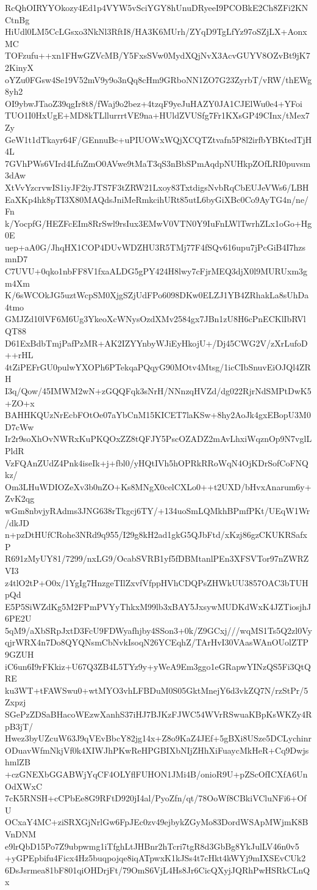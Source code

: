 RcQhOIRYYOkozy4Ed1p4VYW5vSciYGY8hUnuDRyeeI9PCOBkE2Ch8ZFi2KNCtnBg
HiUdl0LM5CcLGsxo3NkNl3RftI8/HA3K6MUrh/ZYqD9TgLfYz97oSZjLX+AonxMC
TOFzufu++xn1FHwGZVcMB/Y5FxsSVw0MydXQjNvX3AcvGUYV8OZvBt9jK72KinyX
oYZu0FGsw4Se19V52mV9y9o3nQq8cHm9GRboNN1ZO7G23ZyrbT/vRW/thEWg8yh2
OI9ybwJTaoZ39qgIr8t8/fWaj9o2bez+4tzqF9yeJuHAZY0JA1CJElWu0e4+YFoi
TUO1I0HxUgE+MD8kTLllurrrtVE9na+HUldZVUSfg7Fr1KXsGP49CInx/tMex7Zy
GeW1t1dTkayr64F/GEnnuBc+uPIUOWxWQjXCQTZtvafn5P8l2irfbYBKtedTjH4L
7GVhPWs6VIrd4LfuZmO0AVwe9tMaT3qS3nBbSPmAqdpNUHkpZOfLRI0puvsm3dAw
XtVvYzcrvwIS1iyJF2iyJTS7F3tZRW21Lxoy83TxtdigsNvbRqCbEUJeVWs6/LBH
EaXKp4hk8pTI3X80MAQdsJniMeRmkcihURt85utL6byGiXBc0Co9AyTG4n/ne/Fn
k/YocpfG/HEZFcEIm8RrSwl9rsIux3EMwV0VTN0Y9IuFnLWlTwrhZLx1oGo+Hg0E
uep+aA0G/JhqHX1COP4DUvWDZHU3R5TMj77F4fSQv616upu7jPcGiB4I7hzsmnD7
C7UVU+0qko1nbFF8V1fxaALDG5gPY424H8lwy7cFjrMEQ3djX0l9MURUxm3gm4Xm
K/6sWCOkJG5uztWcpSM0XjgSZjUdFPo6098DKw0ELZJ1YB4ZRhakLa8sUhDa4tmo
GMJZd10lVF6M6Ug3YkeoXcWNysOzdXMv2584gx7JBn1zU8H6cPnECKlIbRVlQT88
D61ExBdbTmjPafPzMR+AK2IZYYnbyWJiEyHkojU+/Dj45CWG2V/zXrLufoD++rHL
4tZiPEFrGU0pulwYXOPh6PTekqaPQqyG90MOtv4Mtsg/1icCIbSnuvEiOJQl4ZRH
I3q/Qow/45IMWM2wN+zGQQFqk3sNrH/NNnzqHVZd/dg022RjrNdSMPtDwK5+ZO+x
BAHHKQUzNrEcbFOtOe07aYbCnM15KICET7laKSw+8hy2AoJk4gxEBopU3M0D7cWw
Ir2r9soXhOvNWRxKuPKQOxZZ8tQFJY5PscOZADZ2mAvLhxiWqznOp9N7vglLPldR
VzFQAnZUdZ4Pnk4iseIk+j+fbl0/yHQtIVh5hOPRkRRoWqN4OjKDrSofCoFNQkz/
Om3LHuWDIOZeXv3b0nZO+Ks8MNgX0celCXLo0++t2UXD/bHvxAnarum6y+ZvK2qg
wGm8nbvjyRAdms3JNG638rTkgcj6TY/+134uoSmLQMkhBPmfPKt/UEqW1Wr/dkJD
n+pzDtHUfCRohe3NRd9q955/I29g8kH2ad1gkG5QJbFtd/xKzj86gzCKUKRSafxP
R691zMyUY81/7299/nxLG9/OcabSVRB1yf5fDBMtanlPEn3XFSVTor97nZWRZVI3
z4tlO2tP+O0x/1YgIg7HnzgeTIlZxvfVfppHVhCDQPsZHWkUU3857OAC3bTUHpQd
E5P5SiWZdKg5M2FPmPVYyThkxM99lb3xBAY5JxsywMUDKdWxK4JZTiosjhJ6PE2U
5qM9/aXbSRpJxtD3FcU9FDWyafhjby4SSon3+0k/Z9GCxj///wqMS1Ts5Q2zl0Vy
qjrWRX4n7Do8QYQNsmCbNvkIsoqN26YCEqhZ/TArHvI30VAasWAnOUolZTP9GZUH
iC6un6I9rFKkiz+U67Q3ZB4L5TYz9y+yWeA9Em3ggo1eGRapwYINzQS5Fi3QtQRE
ku3WT+tFAWSwu0+wtMYO3vhLFBDuM0S05GktMnejY6d3vkZQ7N/rzStPr/5Zxpzj
SGePzZDSaBHacoWEzwXanhS37iHJ7BJKzFJWC54WVrRSwuaKBpKsWKZy4RpB3jT/
Hwez3byUZcuW63J9qVEvBbcY82jg14x+Z8o9KaZ4JEf+5gBXi8USze5DCLychinr
ODuavWfmNkjVf0k4XIWJhPKwReHPGBIXbNIjZHhXiFuaycMkHeR+Cq9DwjshmlZB
+czGNEXbGGABWjYqCF4OLYflFUHON1JMi4B/onioR9U+pZScOfICXfA6UnOdXWxC
7cK5RNSH+cCPbEe8G9RFtD920jI4al/PyoZfn/qt/78OoWf8CBkiVCluNFi6+OfU
OCxaY4MC+ziSRXGjNrlGw6FpJEc0zv49ejbykZGyMo83DordWSApMWjmK8BVnDNM
e9lrQbD15Po7Z9ubpwmg1iTfghLtJHBnr2hTcri7tgR8d3GbBg8YkJulLV46n0v5
+yGPEpbifu4Ficx4Hz5buqpojqe8iqATpwxK1kJSs4t7cHkt4kWYj9mIXSEvCUk2
6DsJsrmea81bF801qiOHDrjFt/79OmS6VjL4Hs8Jr6CicQXyjJQRhPwHSRkCLnQx
